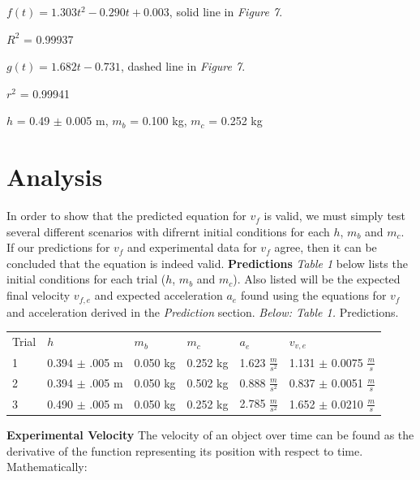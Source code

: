 \documentclass[12pt,letterpaper]{article}
\begin{document}
\(f(t) = 1.303t^2 - 0.290t + 0.003\), solid line in \textit{Figure 7}.

\(R^2\) = 0.99937

\(g(t) = 1.682t - 0.731\), dashed line in \textit{Figure 7}.

\(r^2\) = 0.99941

\(h\) = 0.49 \(\pm\) 0.005 m, \(m_b\) = 0.100 kg, \(m_c\) = 0.252 kg

\newpage
\section{Analysis}
In order to show that the predicted equation for \(v_f\) is valid, we must simply test several different scenarios with difrernt initial conditions for each \(h\), \(m_b\) and \(m_c\). If our predictions for \(v_f\) and experimental data for \(v_f\) agree, then it can be concluded that the equation is indeed valid.
\newline\newline
\textbf{Predictions}
\newline
\textit{Table 1} below lists the initial conditions for each trial (\(h\), \(m_b\) and \(m_c\)). Also listed will be the expected final velocity \(v_{f,e}\) and expected acceleration \(a_e\) found using the equations for \(v_f\) and acceleration derived in the \textit{Prediction} section.
\newline\newline
\textit{Below: Table 1.} Predictions.
{\renewcommand{\arraystretch}{1.2}
\begin{table}[h]
\hspace{0.7in}
\begin{tabular}{l|l|l|l|l|l}
Trial & \(h\) & \(m_b\) & \(m_c\) & \(a_e\) & \(v_{v,e}\)\\
1 & 0.394 \(\pm\) .005 m & 0.050 kg & 0.252 kg & 1.623 \(\frac{m}{s^2}\) & 1.131 \(\pm\) 0.0075 \(\frac{m}{s}\)\\
2 & 0.394 \(\pm\) .005 m & 0.050 kg & 0.502 kg & 0.888 \(\frac{m}{s^2}\) & 0.837 \(\pm\) 0.0051 \(\frac{m}{s}\)\\
3 & 0.490 \(\pm\) .005 m & 0.050 kg & 0.252 kg & 2.785 \(\frac{m}{s^2}\) & 1.652 \(\pm\) 0.0210 \(\frac{m}{s}\)\\                 
\end{tabular}
\end{table}
\newline
}
\textbf{Experimental Velocity}
\newline
The velocity of an object over time can be found as the derivative of the function representing its position with respect to time. Mathematically: 
\end{document}
